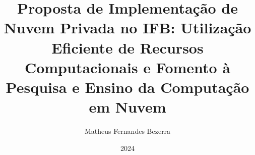 \documentclass[pt,twoside,onehalfspacing,bsc]{ifbclass/ifbclass}
\title{Proposta de Implementação de Nuvem Privada no IFB: Utilização Eficiente de Recursos Computacionais e Fomento à Pesquisa e Ensino da Computação em Nuvem}
\date{2024}
\author{Matheus Fernandes Bezerra}
\begin{document}
  
  \frontmatter
  
  \frontpage
  
  \presentationpage
  
  \begin{fichacatalografica}
    \FakeFichaCatalografica %
  \end{fichacatalografica}
  
  \banca
  
  
  
  
  \resumo
  {\parindent0pt
   
  }
  
  \abstract
  {\parindent0pt
    
  }
  
  \listoffigures
  
  
  \listoftables
  
  
  \tableofcontents
  
  \mainmatter
  
  
  
  
  
  
  

  
  
  \begin{references}
    
  \end{references}
  
  
  
\end{document}
